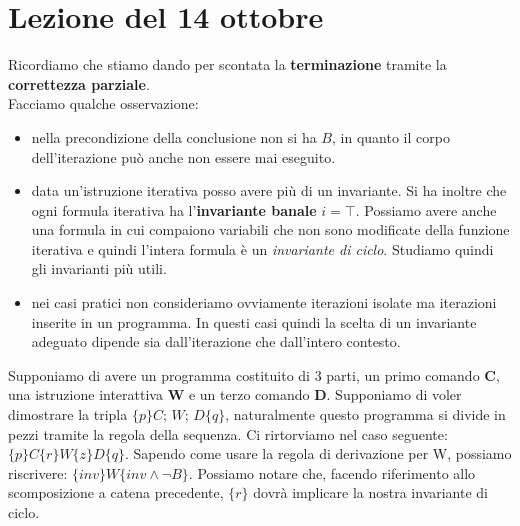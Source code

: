 \section{Lezione del 14 ottobre}
Ricordiamo che stiamo dando per scontata la \textbf{terminazione} tramite la \textbf{correttezza parziale}.\\ Facciamo qualche osservazione: 
\begin{itemize} 
        \item nella precondizione della conclusione non si ha $B$, in quanto il corpo dell'iterazione può anche non essere mai eseguito.
        \item data un'istruzione iterativa posso avere più di un invariante. Si ha inoltre che ogni formula iterativa ha l'\textbf{invariante banale} $i=\top$. Possiamo avere anche una formula in cui compaiono variabili che non sono modificate della funzione iterativa e quindi l'intera formula è un \textit{invariante di ciclo}. Studiamo quindi gli invarianti più utili.
        \item nei casi pratici non consideriamo ovviamente iterazioni isolate ma iterazioni inserite in un programma. In questi casi quindi la scelta di un invariante adeguato dipende sia dall'iterazione che dall'intero contesto.
\end{itemize}

Supponiamo di avere un programma costituito di 3 parti, un primo comando \textbf{C}, una istruzione interattiva \textbf{W} e un terzo comando \textbf{D}. Supponiamo di voler dimostrare la tripla $\{p\}C;\, W;\, D \{q\}$, naturalmente questo programma si divide in pezzi tramite la regola della sequenza. Ci rirtorviamo nel caso seguente:
$\{p\}C\{r\} W \{z\} D \{q\}$. Sapendo come usare la regola di derivazione per W, possiamo riscrivere: $\{inv\}W\{inv \land \neg B\}$. Possiamo notare che, facendo riferimento allo scomposizione a catena precedente, $\{r\}$ dovrà implicare la nostra invariante di ciclo. 